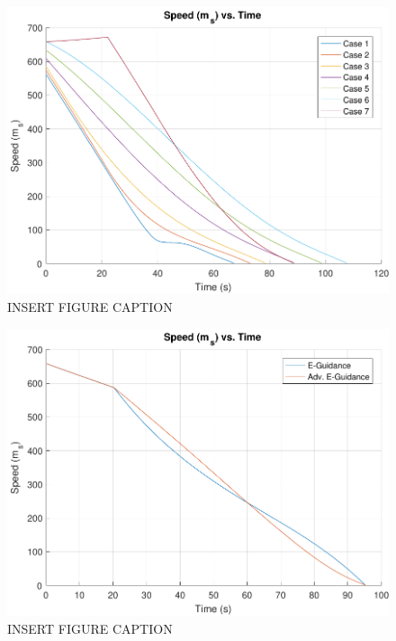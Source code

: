 \begin{figure}[H]
	\centering
	\begin{minipage}{4.5 in}
		\includegraphics[width=\linewidth]{Figures/spdpowvac.pdf}
		\caption{INSERT FIGURE CAPTION \label{fig:spdpowvac} }
	\end{minipage}
\end{figure}



\begin{figure}[H]
	\centering
	\begin{minipage}{4.5 in}
		\includegraphics[width=\linewidth]{Figures/spdsimvsadv.pdf}
		\caption{INSERT FIGURE CAPTION \label{fig:spdsimvsadv} }
	\end{minipage}
\end{figure}



